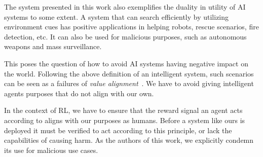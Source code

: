 The system presented in this work also exemplifies the duality in utility of AI systems to some extent.
A system that can search efficiently by utilizing environment cues has positive applications in helping robots, rescue scenarios, fire detection, etc.
It can also be used for malicious purposes, such as autonomous weapons and mass surveillance.

This poses the question of how to avoid AI systems having negative impact on the world.
Following the above definition of an intelligent system, such scenarios can be seen as a failures of \textit{value alignment}~\cite{russell_provably_2022}.
We have to avoid giving intelligent agents purposes that do not align with our own.

In the context of RL, we have to ensure that the reward signal an agent acts according to aligns with our purposes as humans.
Before a system like ours is deployed it must be verified to act according to this principle, or lack the capabilities of causing harm.
As the authors of this work, we explicitly condemn its use for malicious use cases.
